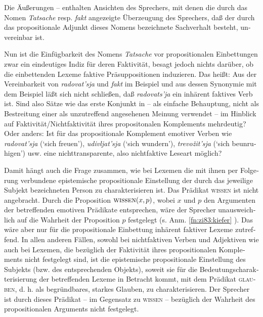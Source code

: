 \documentclass[output=paper]{langscibook}
\begin{document}
\begin{otherlanguage}{german}
\noindent Die Äußerungen -- enthalten Ansichten des Sprechers, mit denen die durch das Nomen \textit{Tatsache} resp. \textit{fakt} angezeigte Überzeugung des Sprechers, daß der durch das propositionale Adjunkt dieses Nomens bezeichnete Sachverhalt besteht, unvereinbar ist.

Nun ist die Einfügbarkeit des Nomens \textit{Tatsache} vor propositionalen Einbettungen zwar ein eindeutiges Indiz für deren Faktivität, besagt jedoch nichts darüber, ob die einbettenden Lexeme faktive Präsuppositionen induzieren. Das heißt: Aus der Vereinbarkeit von \textit{radovat’sja} und \textit{fakt} im Beispiel  und aus dessen Sy\-no\-nymie mit dem Beispiel  läßt sich nicht schließen, daß \textit{radovats’ja} ein inhärent faktives Verb ist. Sind also Sätze wie das erste Konjunkt in  -- als einfache Behauptung, nicht als Bestreitung einer als unzutreffend angesehenen Meinung verwendet -- im Hinblick auf Faktivität/Nichtfaktivität ihres propositonalen Komplements mehrdeutig? Oder anders: Ist für das propositionale Komplement emotiver Verben wie \textit{radovat’sja} (‘sich freuen’), \textit{udivljat’sja} (‘sich wundern’), \textit{trevožit’sja} (‘sich beunruhigen’) usw. eine nichttransparente, also nichtfaktive Leseart möglich?

Damit hängt auch die Frage zusammen, wie bei Lexemen die mit ihnen per Folgerung verbundene epistemische propositionale Einstellung der durch das je\-wei\-li\-ge Subjekt bezeichneten Person zu charakterisieren ist. Das Prädikat \textsc{wissen} ist nicht angebracht. Durch die Proposition $\textsc{wissen}(x, p)$, wobei $x$ und $p$ den Argumenten der betreffenden emotiven Prädikate entsprechen, wäre der Sprecher unausweichlich auf die Wahrheit der Proposition $p$ festgelegt (s. Anm. \ref{fn:zi83:kiefer}%
). Das wäre aber nur für die propositionale Einbettung inhärent faktiver Le\-xe\-me zutreffend. In allen anderen Fällen, sowohl bei nichtfaktiven Verben und Adjektiven wie auch bei Le\-xe\-men, die bezüglich der Faktivität ihres propositionalen Komplements nicht festgelegt sind, ist die epistemische propositionale Einstellung des Subjekts (bzw. des entsprechenden Objekts), soweit sie für die Bedeutungscharakterisierung der betreffenden Lexeme in Betracht kommt, mit dem Prädikat \textsc{glauben}, d. h. als begründbares, starkes Glauben, zu charakterisieren. Der Sprecher ist durch dieses Prädikat -- im Gegensatz zu \textsc{wissen} -- bezüglich der Wahrheit des propositionalen Arguments nicht festgelegt.


\end{otherlanguage}
\end{document}

